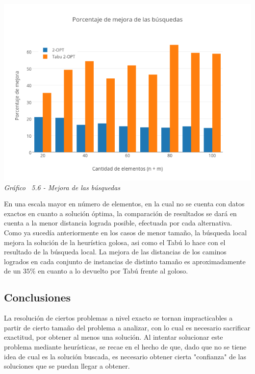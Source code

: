     \vspace*{0.3cm} \vspace*{0.3cm}
  \begin{center}
 \includegraphics[scale=0.5]{./EJ5/mejoraGrande.png}\\
 {\textit{Gráfico \ 5.6 - Mejora de las búsquedas}}
  \end{center}
  \vspace*{0.3cm}

En una escala mayor en número de elementos, en la cual no se cuenta con datos exactos en cuanto a solución óptima, la comparación de resultados se dará en cuenta a la menor distancia lograda posible, efectuada por cada alternativa. Como ya sucedía anteriormente en los casos de menor tamaño, la búsqueda local mejora la solución de la heurística golosa, asi como el Tabú lo hace con el resultado de la búsqueda local. La mejora de las distancias de los caminos logrados en cada conjunto de instancias de distinto tamaño es aproximadamente de un $35\%$ en cuanto a lo devuelto por Tabú frente al goloso.

\subsection{Conclusiones}

La resolución de ciertos problemas a nivel exacto se tornan impracticables a partir de cierto tamaño del problema a analizar, con lo cual es necesario sacrificar exactitud, por obtener al menos una solución. Al intentar solucionar este problema mediante heurísticas, se recae en el hecho de que, dado que no se tiene idea de cual es la solución buscada, es necesario obtener cierta "confianza" de las soluciones que se puedan llegar a obtener.


